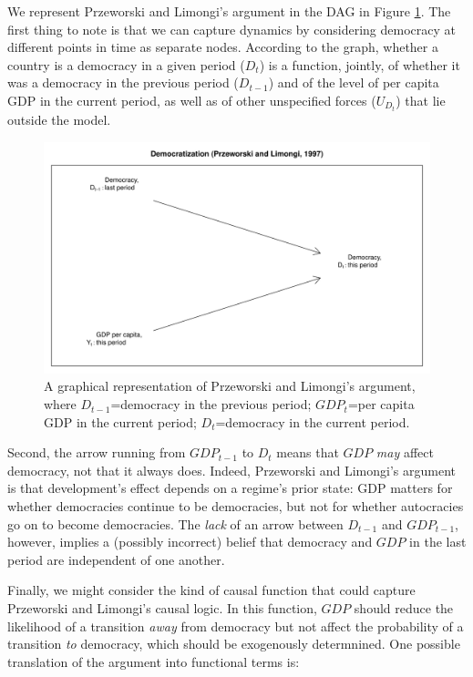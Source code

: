 \documentclass[12pt,]{book}
\begin{document}
We represent Przeworski and Limongi's argument in the DAG in Figure \ref{fig:DAGPL}. The first thing to note is that we can capture dynamics by considering democracy at different points in time as separate nodes. According to the graph, whether a country is a democracy in a given period (\(D_t\)) is a function, jointly, of whether it was a democracy in the previous period (\(D_{t-1}\)) and of the level of per capita GDP in the current period, as well as of other unspecified forces (\(U_{D_t}\)) that lie outside the model.

\begin{figure}

{\centering \includegraphics[width=.7\textwidth]{ii_files/figure-latex/DAGPL-1} 

}

\caption{A graphical representation of Przeworski and Limongi's argument, where $D_{t-1}$=democracy in the previous period; $GDP_t$=per capita GDP in the current period; $D_t$=democracy in the current period.}\label{fig:DAGPL}
\end{figure}

Second, the arrow running from \(GDP_{t-1}\) to \(D_t\) means that \(GDP\) \emph{may} affect democracy, not that it always does. Indeed, Przeworski and Limongi's argument is that development's effect depends on a regime's prior state: GDP matters for whether democracies continue to be democracies, but not for whether autocracies go on to become democracies. The \emph{lack} of an arrow between \(D_{t-1}\) and \(GDP_{t-1}\), however, implies a (possibly incorrect) belief that democracy and \(GDP\) in the last period are independent of one another.

Finally, we might consider the kind of causal function that could capture Przeworski and Limongi's causal logic. In this function, \(GDP\) should reduce the likelihood of a transition \emph{away} from democracy but not affect the probability of a transition \emph{to} democracy, which should be exogenously determnined. One possible translation of the argument into functional terms is:
\end{document}
